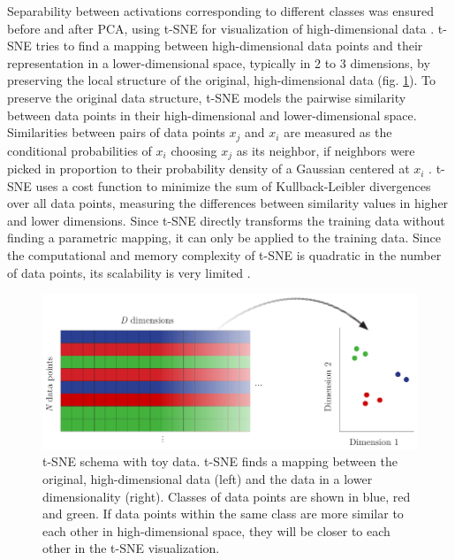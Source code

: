 \documentclass[10pt]{article}
\begin{document}
Separability between activations corresponding to different classes was ensured before and after \gls{PCA}, using \acrfull{t-SNE} for visualization of high-dimensional data \cite{Maaten2008VisualizingDU}. \gls{t-SNE} tries to find a mapping between high-dimensional data points and their representation in a lower-dimensional space, typically in 2 to 3 dimensions, by preserving the local structure of the original, high-dimensional data (fig. \ref{fig:t-SNE-schema}). To preserve the original data structure, \gls{t-SNE} models the pairwise similarity between data points in their high-dimensional and lower-dimensional space. Similarities between pairs of data points $x_j$ and $x_i$ are measured as the conditional probabilities of $x_i$ choosing $x_j$ as its neighbor, if neighbors were picked in proportion to their probability density of a Gaussian centered at $x_i$ \cite{Maaten2008VisualizingDU}. \gls{t-SNE} uses a cost function to minimize the sum of Kullback-Leibler divergences over all data points, measuring the differences between similarity values in higher and lower dimensions. Since \gls{t-SNE} directly transforms the training data without finding a parametric mapping, it can only be applied to the training data. Since the computational and memory complexity of \gls{t-SNE} is quadratic in the number of data points, its scalability is very limited \cite{Maaten2008VisualizingDU}.

\begin{figure}[H]
	\centering
	\includegraphics[width=.9\textwidth]{Schema/t-SNE-schema}
	\caption{\gls{t-SNE} schema with toy data. \gls{t-SNE} finds a mapping between the original, high-dimensional data (left) and the data in a lower dimensionality (right). Classes of data points are shown in blue, red and green. If data points within the same class are more similar to each other in high-dimensional space, they will be closer to each other in the \gls{t-SNE} visualization.}
	\label{fig:t-SNE-schema}
\end{figure}
\end{document}
